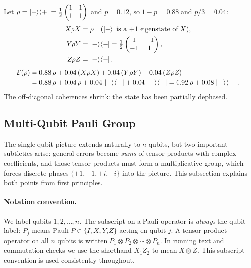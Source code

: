 \documentclass[11pt, a4paper]{article}
\theoremstyle{definition}
\theoremstyle{plain}
\theoremstyle{remark}
\providecommand{\proj}[1]{\ket{#1}\!\bra{#1}}
\begin{document}
\begin{workedexample}
Let $\rho = \proj{+} = \tfrac{1}{2}\begin{pmatrix}1&1\\1&1\end{pmatrix}$
and $p = 0.12$, so $1-p = 0.88$ and $p/3 = 0.04$:
\begin{align*}
  X\rho X &= \rho \quad (\ket{+} \text{ is a } {+1} \text{ eigenstate of } X),\\
  Y\rho Y &= \proj{-} = \tfrac{1}{2}\begin{pmatrix}1&-1\\-1&1\end{pmatrix},\\
  Z\rho Z &= \proj{-}.
\end{align*}
\begin{align*}
  \mathcal{E}(\rho)
  &= 0.88\,\rho + 0.04\,(X\rho X) + 0.04\,(Y\rho Y) + 0.04\,(Z\rho Z)\\
  &= 0.88\,\rho + 0.04\,\rho + 0.04\,\proj{-} + 0.04\,\proj{-}
   = 0.92\,\rho + 0.08\,\proj{-}.
\end{align*}
The off-diagonal coherences shrink: the state has been partially dephased.
\end{workedexample}

\subsection{Multi-Qubit Pauli Group}
\label{sec:pauli-group}

The single-qubit picture extends naturally to $n$ qubits, but two
important subtleties arise: general errors become \emph{sums} of tensor
products with complex coefficients, and those tensor products must form a
multiplicative group, which forces discrete phases $\{+1,-1,+i,-i\}$ into
the picture.  This subsection explains both points from first principles.

\paragraph{Notation convention.}
We label qubits $1, 2, \ldots, n$.  The subscript on a Pauli operator is
\emph{always} the qubit label: $P_j$ means Pauli $P\in\{I,X,Y,Z\}$ acting
on qubit $j$.  A tensor-product operator on all $n$ qubits is written
$P_1 \otimes P_2 \otimes \cdots \otimes P_n$.  In running text and
commutation checks we use the shorthand $X_1 Z_2$ to mean $X\otimes Z$.
This subscript convention is used consistently throughout.
\end{document}
